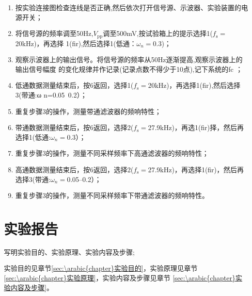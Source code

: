 \documentclass[../main]{subfiles}
\begin{document}
\begin{enumerate}

	\item 按实验连接图检查连线是否正确,然后依次打开信号源、示波器、实验装置的电源开关；

	\item 将信号源的频率调至50Hz,$ V_\mathrm{pp}$调至500mV,按试验箱上的提示选择1($ f_\mathrm{s} = $20kHz)，再选择
		1(fir),然后选择1(低通：$ \omega_n = $0.3)；

	\item 观察示波器上的输出信号。将信号源的频率从50Hz逐渐提高,观察示波器上的输出信号幅度
		的变化规律并作记录(记录点数不得少于10点),记下系统的fc ；

	\item 低通数据测量结束后，按6返回，选择1($ f_\mathrm{s} = $20kHz)，再选择1(fir),然后选择3(带通:ω
		n=0.05~0.2）；

	\item 重复步骤3的操作，测量带通滤波器的频响特性；

	\item 带通数据测量结束后，按6返回，选择2($ f_\mathrm{s} = $27.9kHz)，再选1(fir)择，然后再选择1(低通:$ \omega_n = $0.3）；

	\item 重复步骤3的操作，测量不同采样频率下高通滤波器的频响特性；

	\item 高通数据测量结束后，按6返回，选择2($ f_\mathrm{s} = $27.9kHz)，再选择1(fir)，然后再选择3(带通:$ \omega_n = $0.05--0.2）；

	\item 重复步骤3的操作，测量不同采样频率下带通滤波器的频响特性。

\end{enumerate}

\section{实验报告}%
\label{sec:\arabic{chapter}实验报告}

\begin{Exercise}

	写明实验目的、实验原理、实验内容及步骤;

\end{Exercise}

\begin{Answer}

	实验目的见章节\ref{sec:\arabic{chapter}实验目的}，实验原理见章节
	\ref{sec:\arabic{chapter}实验原理}，实验内容及步骤见章节
	\ref{sec:\arabic{chapter}实验内容及步骤}。

\end{Answer}
\end{document}
